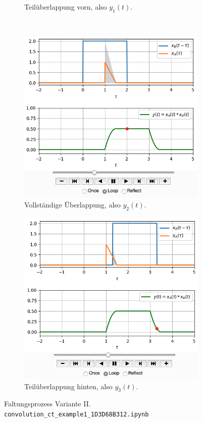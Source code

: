 \documentclass[11pt,a4paper,DIV=12]{scrartcl}
\numberwithin{equation}{section}
\numberwithin{figure}{section}
\begin{document}
\begin{figure}[h!]
\begin{subfigure}{0.45\textwidth}
\caption{Teilüberlappung vorn, also $y_1(t)$.}
\label{fig:1D3D68B312_v2_1}
\end{subfigure}
\\
\begin{subfigure}{0.45\textwidth}
\centering
\includegraphics[width=\textwidth]{../convolution_ct/conv_var2_2_1D3D68B312.png}
\caption{Vollständige Überlappung, also $y_2(t)$.}
\label{fig:1D3D68B312_v2_2}
\end{subfigure}
\begin{subfigure}{0.45\textwidth}
\centering
\includegraphics[width=\textwidth]{../convolution_ct/conv_var2_3_1D3D68B312.png}
\caption{Teilüberlappung hinten, also $y_3(t)$.}
\label{fig:1D3D68B312_v2_3}
\end{subfigure}
%
\caption{Faltungsprozess Variante II.
\texttt{convolution\_ct\_example1\_1D3D68B312.ipynb}}
\label{fig:1D3D68B312_v2}
\end{figure}
\end{document}
